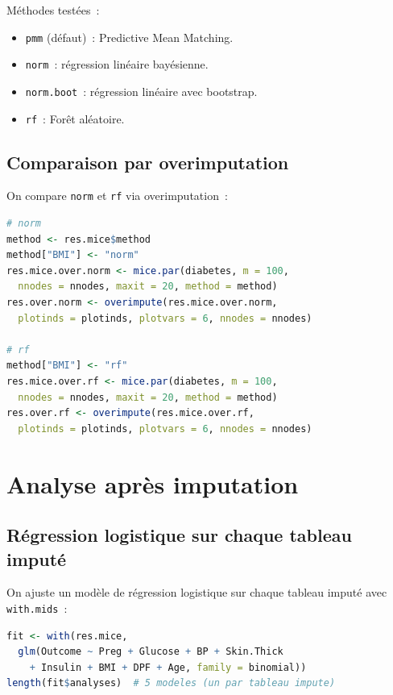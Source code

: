 \documentclass[a4paper,11pt]{article}
\theoremstyle{definition}
\theoremstyle{remark}
\begin{document}
M\'ethodes test\'ees~:
\begin{itemize}
  \item \texttt{pmm} (d\'efaut)~: Predictive Mean Matching.
  \item \texttt{norm}~: r\'egression lin\'eaire bay\'esienne.
  \item \texttt{norm.boot}~: r\'egression lin\'eaire avec bootstrap.
  \item \texttt{rf}~: For\^et al\'eatoire.
\end{itemize}

\subsection{Comparaison par overimputation}

On compare \texttt{norm} et \texttt{rf} via overimputation~:

\begin{lstlisting}[language=R]
# norm
method <- res.mice$method
method["BMI"] <- "norm"
res.mice.over.norm <- mice.par(diabetes, m = 100,
  nnodes = nnodes, maxit = 20, method = method)
res.over.norm <- overimpute(res.mice.over.norm,
  plotinds = plotinds, plotvars = 6, nnodes = nnodes)

# rf
method["BMI"] <- "rf"
res.mice.over.rf <- mice.par(diabetes, m = 100,
  nnodes = nnodes, maxit = 20, method = method)
res.over.rf <- overimpute(res.mice.over.rf,
  plotinds = plotinds, plotvars = 6, nnodes = nnodes)
\end{lstlisting}

\section{Analyse apr\`es imputation}

\subsection{R\'egression logistique sur chaque tableau imput\'e}

On ajuste un mod\`ele de r\'egression logistique sur chaque tableau
imput\'e avec \texttt{with.mids}~:

\begin{lstlisting}[language=R]
fit <- with(res.mice,
  glm(Outcome ~ Preg + Glucose + BP + Skin.Thick
    + Insulin + BMI + DPF + Age, family = binomial))
length(fit$analyses)  # 5 modeles (un par tableau impute)
\end{lstlisting}
\end{document}
